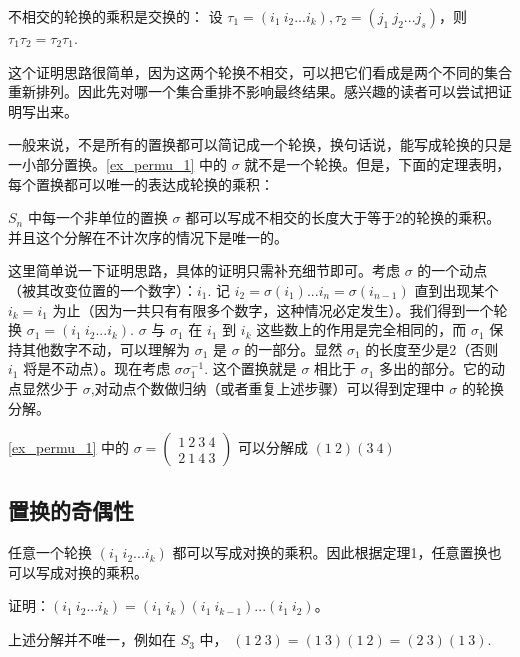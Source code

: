 \begin{lemma}{}
不相交的轮换的乘积是交换的： 设 $\tau_1=(i_1\ i_2...i_k), \tau_2=(j_1\ j_2...j_s)$，则 $\tau_1\tau_2=\tau_2\tau_1$.
\end{lemma}
这个证明思路很简单，因为这两个轮换不相交，可以把它们看成是两个不同的集合重新排列。因此先对哪一个集合重排不影响最终结果。感兴趣的读者可以尝试把证明写出来。

一般来说，不是所有的置换都可以简记成一个轮换，换句话说，能写成轮换的只是一小部分置换。\autoref{ex_permu_1} 中的 $\sigma$ 就不是一个轮换。但是，下面的定理表明，每个置换都可以唯一的表达成轮换的乘积：
\begin{theorem}{}\label{the_permu_2}
$S_n$ 中每一个非单位的置换 $\sigma$ 都可以写成不相交的长度大于等于$2$的轮换的乘积。并且这个分解在不计次序的情况下是唯一的。
\end{theorem}
这里简单说一下证明思路，具体的证明只需补充细节即可。考虑 $\sigma$ 的一个动点（被其改变位置的一个数字）：$i_1$. 记 $i_2=\sigma(i_1)...i_n=\sigma(i_{n-1})$ 直到出现某个 $i_k=i_1$ 为止（因为一共只有有限多个数字，这种情况必定发生）。我们得到一个轮换 $\sigma_1=(i_1\ i_2...i_k)$. $\sigma$ 与 $\sigma_1$ 在 $i_1$ 到 $i_k$ 这些数上的作用是完全相同的，而 $\sigma_1$ 保持其他数字不动，可以理解为 $\sigma_1$ 是 $\sigma$ 的一部分。显然 $\sigma_1$ 的长度至少是2（否则 $i_1$ 将是不动点）。现在考虑 $\sigma\sigma_1^{-1}$. 这个置换就是 $\sigma$ 相比于 $\sigma_1$ 多出的部分。它的动点显然少于 $\sigma$,对动点个数做归纳（或者重复上述步骤）可以得到定理中 $\sigma$ 的轮换分解。

\begin{example}{}
\autoref{ex_permu_1} 中的 $\sigma=\begin{pmatrix}
1\ 2\ 3\ 4\\ 2\ 1\ 4\ 3
\end{pmatrix}$ 可以分解成 $(1\ 2)(3\ 4)$
\end{example}

\subsection{置换的奇偶性}

\begin{lemma}{}\label{lem_permu_1}
任意一个轮换 $(i_1\ i_2...i_k)$ 都可以写成对换的乘积。因此根据定理1，任意置换也可以写成对换的乘积。
\end{lemma}
证明：$(i_1\ i_2...i_k)=(i_1\ i_k)(i_1\ i_{k-1})...(i_1\ i_2)$。

\begin{example}{}
上述分解并不唯一，例如在 $S_3$ 中，
$(1\ 2\ 3)=(1\ 3)(1\ 2)=(2\ 3)(1\ 3)$.
\end{example}

